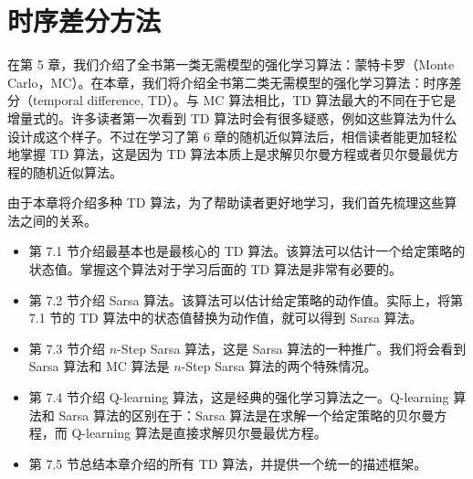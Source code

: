 \chapter{时序差分方法}
\label{ch:rl-td}



在第 5 章，我们介绍了全书第一类无需模型的强化学习算法：蒙特卡罗（Monte Carlo，MC）。在本章，我们将介绍全书第二类无需模型的强化学习算法：时序差分（temporal difference, TD）。与 MC 算法相比，TD 算法最大的不同在于它是增量式的。许多读者第一次看到 TD 算法时会有很多疑惑，例如这些算法为什么设计成这个样子。不过在学习了第 6 章的随机近似算法后，相信读者能更加轻松地掌握 TD 算法，这是因为 TD 算法本质上是求解贝尔曼方程或者贝尔曼最优方程的随机近似算法。

由于本章将介绍多种 TD 算法，为了帮助读者更好地学习，我们首先梳理这些算法之间的关系。

\begin{itemize}
  \item 第 7.1 节介绍最基本也是最核心的 TD 算法。该算法可以估计一个给定策略的状态值。掌握这个算法对于学习后面的 TD 算法是非常有必要的。
  \item 第 7.2 节介绍 Sarsa 算法。该算法可以估计给定策略的动作值。实际上，将第 7.1 节的 TD 算法中的状态值替换为动作值，就可以得到 Sarsa 算法。
  \item 第 7.3 节介绍 $n$-Step Sarsa 算法，这是 Sarsa 算法的一种推广。我们将会看到 Sarsa 算法和 MC 算法是 $n$-Step Sarsa 算法的两个特殊情况。
  \item 第 7.4 节介绍 Q-learning 算法，这是经典的强化学习算法之一。Q-learning 算法和 Sarsa 算法的区别在于：Sarsa 算法是在求解一个给定策略的贝尔曼方程，而 Q-learning 算法是直接求解贝尔曼最优方程。
  \item 第 7.5 节总结本章介绍的所有 TD 算法，并提供一个统一的描述框架。
\end{itemize}

